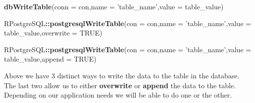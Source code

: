 \documentclass[]{book}
\newenvironment{Shaded}{\begin{snugshade}}{\end{snugshade}}
\newcommand{\KeywordTok}[1]{\textcolor[rgb]{0.13,0.29,0.53}{\textbf{#1}}}
\newcommand{\DataTypeTok}[1]{\textcolor[rgb]{0.13,0.29,0.53}{#1}}
\newcommand{\StringTok}[1]{\textcolor[rgb]{0.31,0.60,0.02}{#1}}
\newcommand{\OtherTok}[1]{\textcolor[rgb]{0.56,0.35,0.01}{#1}}
\newcommand{\OperatorTok}[1]{\textcolor[rgb]{0.81,0.36,0.00}{\textbf{#1}}}
\newcommand{\NormalTok}[1]{#1}
\begin{document}
\begin{Shaded}
\begin{Highlighting}[]
\KeywordTok{dbWriteTable}\NormalTok{(}\DataTypeTok{conn =}\NormalTok{ con,}\DataTypeTok{name =} \StringTok{'table_name'}\NormalTok{,}\DataTypeTok{value =}\NormalTok{ table_value)}

\NormalTok{RPostgreSQL}\OperatorTok{::}\KeywordTok{postgresqlWriteTable}\NormalTok{(}\DataTypeTok{con =}\NormalTok{ con,}\DataTypeTok{name =} \StringTok{'table_name'}\NormalTok{,}\DataTypeTok{value =}\NormalTok{ table_value,}\DataTypeTok{overwrite =} \OtherTok{TRUE}\NormalTok{)}

\NormalTok{RPostgreSQL}\OperatorTok{::}\KeywordTok{postgresqlWriteTable}\NormalTok{(}\DataTypeTok{con =}\NormalTok{ con,}\DataTypeTok{name =} \StringTok{'table_name'}\NormalTok{,}\DataTypeTok{value =}\NormalTok{ table_value,}\DataTypeTok{append =} \OtherTok{TRUE}\NormalTok{)}
\end{Highlighting}
\end{Shaded}

Above we have 3 distinct ways to write the data to the table in the
database. The last two allow us to either \textbf{overwrite} or
\textbf{append} the data to the table. Depending on our application
needs we will be able to do one or the other.
\end{document}
